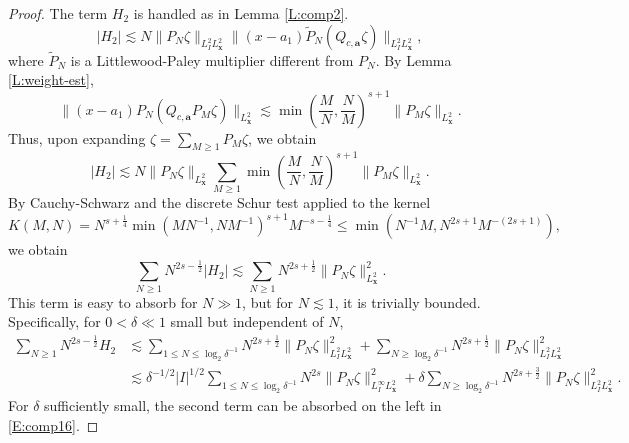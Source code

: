 \documentclass[12pt,letterpaper]{amsart}
\theoremstyle{remark}
\numberwithin{equation}{section}
\numberwithin{theorem}{section}
\numberwithin{table}{section}
\begin{document}
\begin{proof}
The term $H_2$ is handled as in Lemma \ref{L:comp2}.  
$$
|H_2| \lesssim N \|P_N \zeta \|_{L_I^2L_{\mathbf{x}}^2} \| (x-a_1) \tilde P_N ( Q_{c,\mathbf{a}} \zeta) \|_{L_I^2 L_{\mathbf{x}}^2},
$$
where $\tilde P_N$ is a Littlewood-Paley multiplier different from $P_N$.
By Lemma \ref{L:weight-est},
$$
\| (x-a_1) P_N( Q_{c,\mathbf{a}} P_M \zeta) \|_{L_{\mathbf{x}}^2} \lesssim \min\left( \frac{M}{N}, \frac{N}{M}\right)^{s+1} \|P_M \zeta \|_{L_{\mathbf{x}}^2}.
$$
Thus, upon expanding $\zeta = \sum_{M \geq 1} P_M \zeta$, we obtain
$$
|H_2| \lesssim N \| P_N \zeta \|_{L_{\mathbf{x}}^2}  \sum_{M\geq 1} \min\left( \frac{M}{N}, \frac{N}{M}\right)^{s+1}\| P_M \zeta \|_{L_{\mathbf{x}}^2}.
$$
By Cauchy-Schwarz and the discrete Schur test applied to the kernel 
$$
K(M,N) = N^{s+\frac14} \min(MN^{-1}, NM^{-1})^{s+1} M^{-s-\frac14} \leq \min( N^{-1}M, N^{2s+1}M^{-(2s+1)}),
$$
we obtain
$$
\sum_{N\geq 1} N^{2s-\frac12}|H_2|  \lesssim \sum_{N\geq 1} N^{2s+\frac12} \|P_N \zeta\|_{L_{\mathbf{x}}^2}^2.
$$
This term is easy to absorb for $N \gg 1$, but for $N \lesssim 1$, it is trivially bounded.  Specifically, for $0< \delta \ll 1$ small but independent of $N$,
\begin{align*}
\sum_{N\geq 1} N^{2s-\frac12} H_2 &\lesssim \sum_{1\leq N\leq \log_2 \delta^{-1}} N^{2s+\frac12}  \|P_N \zeta \|_{L_I^2 L_{\mathbf{x}}^2}^2 + \sum_{N\geq \log_2 \delta^{-1}} N^{2s+\frac12}  \|P_N \zeta \|_{L_I^2 L_{\mathbf{x}}^2}^2 \\
&\lesssim \delta^{-1/2}|I|^{1/2}\sum_{1\leq N\leq \log_2 \delta^{-1}} N^{2s}  \|P_N \zeta \|_{L_I^\infty L_{\mathbf{x}}^2}^2 + \delta \sum_{N\geq \log_2 \delta^{-1}} N^{2s+\frac32}  \|P_N \zeta \|_{L_I^2 L_{\mathbf{x}}^2}^2.
\end{align*}
For $\delta$ sufficiently small, the second term can be absorbed on the left in \eqref{E:comp16}.


\end{proof}
\end{document}
